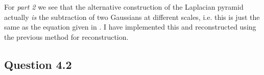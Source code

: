 \documentclass[a4paper, 10pt, final]{article}
\begin{document}
For \emph{part 2} we see that the alternative construction of the
Laplacian pyramid actually \emph{is} the subtraction of two Gaussians
at different scales, i.e. this is just the same as the equation given in
\citep[exercise 5.3]{jahne-digital}. I have implemented this and
reconstructed using the previous method for reconstruction.

\subsection*{Question 4.2}




\end{document}
